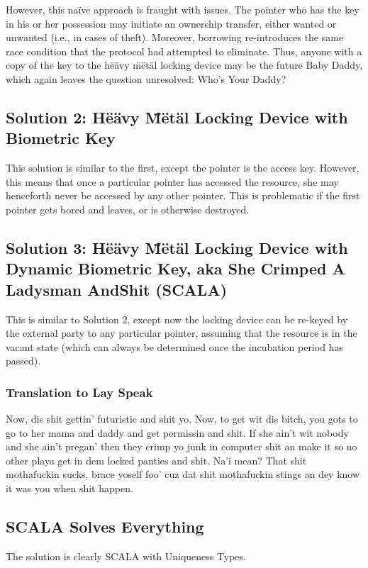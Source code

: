 \documentclass[nocopyrightspace,10pt]{sigplanconf}
\begin{document}
However, this na\"{i}ve approach is fraught with issues. The pointer who has the key in his or her possession may initiate an ownership transfer, either wanted or unwanted (i.e., in cases of theft). Moreover, borrowing re-introduces the same race condition that the protocol had attempted to eliminate. Thus, anyone with a copy of the key to the h\"{e}\"{a}vy \"{m}\"{e}t\"{a}l locking device may be the future Baby Daddy, which again leaves the question unresolved: Who's Your Daddy?

\subsection{Solution 2: H\"{e}\"{a}vy \"{M}\"{e}t\"{a}l Locking Device with Biometric Key}
This solution is similar to the first, except the pointer is the access key. However, this means that once a particular pointer has accessed the resource, she may henceforth never be accessed by any other pointer. This is problematic if the first pointer gets bored and leaves, or is otherwise destroyed.

\subsection{Solution 3: H\"{e}\"{a}vy \"{M}\"{e}t\"{a}l Locking Device with Dynamic Biometric Key, aka She Crimped A Ladysman AndShit (SCALA)}
This is similar to Solution 2, except now the locking device can be re-keyed by the external party to any particular pointer, assuming that the resource is in the vacant state (which can always be determined once the incubation period has passed).

\subsubsection{Translation to Lay Speak}
Now, dis shit gettin' futuristic and shit yo. Now, to get wit dis bitch, you gots to go to her mama and daddy and get permissin and shit. If she ain't wit nobody and she ain't pregan' then they crimp yo junk in computer shit an make it so no other playa get in dem locked panties and shit. Na'i mean? That shit mothafuckin sucks, brace yoself foo' cuz dat shit mothafuckin stings an dey know it was you when shit happen.

\subsection{SCALA Solves Everything}
The solution is clearly SCALA with Uniqueness Types.
\end{document}
